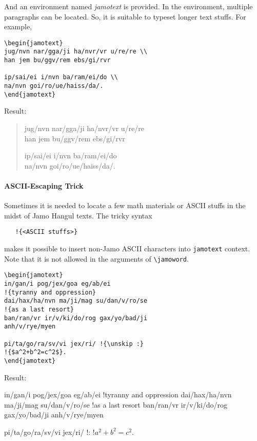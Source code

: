 \documentclass[a4paper]{article}
\newenvironment{korean}{}{}
\begin{document}
And an environment named \emph{jamotext} is provided.
In the environment, multiple paragraphs can be located. So, it is
suitable to typeset longer text stuffs. For example,
\begin{verbatim}
\begin{jamotext}
jug/nvn nar/gga/ji ha/nvr/vr u/re/re \\
han jem bu/ggv/rem ebs/gi/rvr 

ip/sai/ei i/nvn ba/ram/ei/do \\
na/nvn goi/ro/ue/haiss/da/.
\end{jamotext}
\end{verbatim}
Result:
\begin{quote}
\begin{korean}
\begin{jamotext}
jug/nvn nar/gga/ji ha/nvr/vr u/re/re \\
han jem bu/ggv/rem ebs/gi/rvr 

ip/sai/ei i/nvn ba/ram/ei/do \\
na/nvn goi/ro/ue/haiss/da/.
\end{jamotext}
\end{korean}
\end{quote}

\paragraph{ASCII-Escaping Trick}
Sometimes it is needed to locate a few math materials or ASCII stuffs
in the midst of Jamo Hangul texts. The tricky syntax 
\begin{verbatim}
   !{<ASCII stuffs>}
\end{verbatim}
makes it possible to insert non-Jamo ASCII characters into \texttt{jamotext}
context. Note that it is not allowed in the arguments of \verb|\jamoword|.

\begin{verbatim}
\begin{jamotext}
in/gan/i pog/jex/goa eg/ab/ei 
!{tyranny and oppression} 
dai/hax/ha/nvn ma/ji/mag su/dan/v/ro/se 
!{as a last resort}
ban/ran/vr ir/v/ki/do/rog gax/yo/bad/ji 
anh/v/rye/myen

pi/ta/go/ra/sv/vi jex/ri/ !{\unskip :} 
!{$a^2+b^2=c^2$}.
\end{jamotext}
\end{verbatim}

\noindent Result:\\
\begin{jamotext}
in/gan/i pog/jex/goa eg/ab/ei 
!{tyranny and oppression} 
dai/hax/ha/nvn ma/ji/mag su/dan/v/ro/se 
!{as a last resort}
ban/ran/vr ir/v/ki/do/rog gax/yo/bad/ji 
anh/v/rye/myen

pi/ta/go/ra/sv/vi jex/ri/ !{\unskip :} !{$a^2+b^2=c^2$}.
\end{jamotext}
\end{document}
